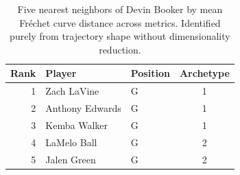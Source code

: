\begin{table}[htbp]
  \centering\small
  \begin{tabular}{rllc}
    \toprule
    Rank & Player & Position & Archetype \\
    \midrule
    1 & Zach LaVine & G & 1 \\
    2 & Anthony Edwards & G & 1 \\
    3 & Kemba Walker & G & 1 \\
    4 & LaMelo Ball & G & 2 \\
    5 & Jalen Green & G & 2 \\
    \bottomrule
  \end{tabular}
  \caption{Five nearest neighbors of Devin Booker by mean Fr\'{e}chet curve distance across metrics. Identified purely from trajectory shape without dimensionality reduction.}
  \label{tab:Devin_Booker_frechet_curve_neighbors}
\end{table}

